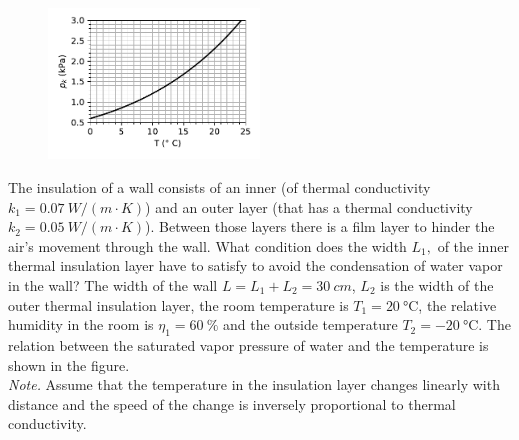 \documentclass[11pt]{article}
\begin{document}

\probeng
\begin{figure}
\vspace{-30pt}
\begin{center}
\includegraphics[width=0.5\textwidth]{2018-v3g-05-kullastunud-aur}
\par\end{center} 
\end{figure}
The insulation of a wall consists of an inner (of thermal conductivity $k_{1}=\SI{0.07}{W/\left(m\cdot K\right)}$) and an outer layer (that has a thermal conductivity $k_{2}=\SI{0.05}{W/\left(m\cdot K\right)}$). Between those layers there is a film layer to hinder the air’s movement through the wall. What condition does the width $L_{1},$ of the inner thermal insulation layer have to satisfy to avoid the condensation of water vapor in the wall? The width of the wall $L=L_{1}+L_{2}=\SI{30}{cm}$, $L_{2}$ is the width of the outer thermal insulation layer, the room temperature is $T_{1}=\SI{20}{\degreeCelsius}$, the relative humidity in the room is $\eta_{1}=\SI{60}{\percent}$ and the outside temperature $T_{2}=\SI{-20}{\degreeCelsius}$. The relation between the saturated vapor pressure of water and the temperature is shown in the figure.\\
\emph{Note.} Assume that the temperature in the insulation layer changes linearly with distance and the speed of the change is inversely proportional to thermal conductivity.
\probend
\bigskip

\end{document}
